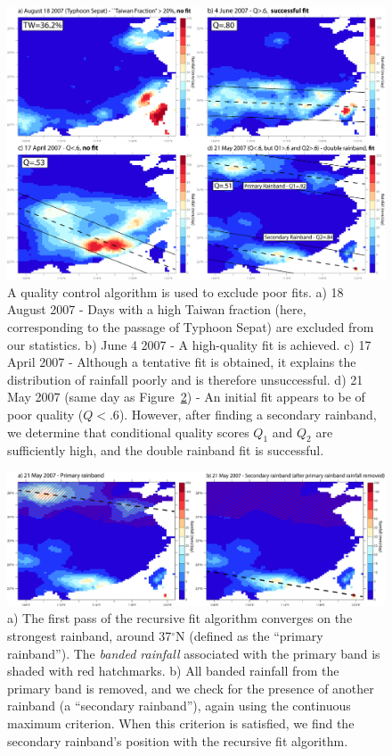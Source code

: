 \documentclass[singlecolumn,11pt]{pnas-new}
\begin{document}
\clearpage

\begin{figure}[htbp]
\centering
\noindent\includegraphics[width=39pc]{Figures/S4}
\caption{A quality control algorithm is used to exclude poor fits. a) 18 August 2007 - Days with a high Taiwan fraction (here, corresponding to the passage of Typhoon Sepat) are excluded from our statistics. b) June 4 2007 - A high-quality fit is achieved. c) 17 April 2007 - Although a tentative fit is obtained, it explains the distribution of rainfall poorly and is therefore unsuccessful. d) 21 May 2007 (same day as Figure~\ref{fig:algo_4}) - An initial fit appears to be of poor quality ($Q<.6$). However, after finding a secondary rainband, we determine that conditional quality scores $Q_1$ and $Q_2$ are sufficiently high, and the double rainband fit is successful.}
\label{fig:algo_3}
\end{figure}

\begin{figure}[htbp]
\centering
\noindent\includegraphics[width=39pc]{Figures/S3}
\caption{a) The first pass of the recursive fit algorithm converges on the strongest rainband, around 37$^{\circ}$N (defined as the ``primary rainband''). The \textit{banded rainfall} associated with the primary band is shaded with red hatchmarks. b) All banded rainfall from the primary band is removed, and we check for the presence of another rainband (a ``secondary rainband''), again using the continuous maximum criterion. When this criterion is satisfied, we find the secondary rainband's position with the recursive fit algorithm.}
\label{fig:algo_4}
\end{figure}
\end{document}
